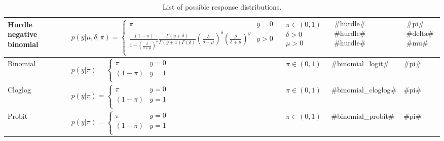\begin{sidewaystable}[htbp]
\begin{center}
\begin{tabular}{l l c l l}
Hurdle negative binomial &$p(y|\mu,\delta,\pi)=\begin{cases}
	\pi & y=0\\
		\frac{(1-\pi)}{1-\left(\frac{\delta}{\delta+\mu}\right)^{\delta}}\frac{\Gamma(y+\delta)}{\Gamma(y+1)\Gamma(\delta)}\left(\frac{\delta}{\delta+\mu}\right)^{\delta}\left(\frac{\mu}{\delta+\mu}\right)^{y} & y>0\\
			\end{cases}$&$\begin{matrix} \pi\in(0,1)\\\delta>0\\\mu>0
					 	\end{matrix}$ &$\begin{matrix} \text{#hurdle#}\\\text{#hurdle#}\\\text{#hurdle#}
					\end{matrix}$&$\begin{matrix} \text{#pi#}\\\text{#delta#}\\\text{#mu#}
					\end{matrix}$\\\hline
Binomial &$p(y|\pi)=\begin{cases}
	\pi & y=0\\
		(1-\pi) & y=1\\
			\end{cases}$&$\pi\in(0,1)$&#binomial_logit#&#pi#\\\hline
Cloglog &$p(y|\pi)=\begin{cases}
	\pi & y=0\\
		(1-\pi) & y=1\\
			\end{cases}$&$\pi\in(0,1)$&#binomial_cloglog#&#pi#\\\hline
Probit &$p(y|\pi)=\begin{cases}
	\pi & y=0\\
		(1-\pi) & y=1\\
			\end{cases}$&$\pi\in(0,1)$&#binomial_probit#&#pi#\\
\hline\hline
\end{tabular}
\end{center}\caption{List of possible response distributions.}\label{tab:distrBayesX2}
\end{sidewaystable}


